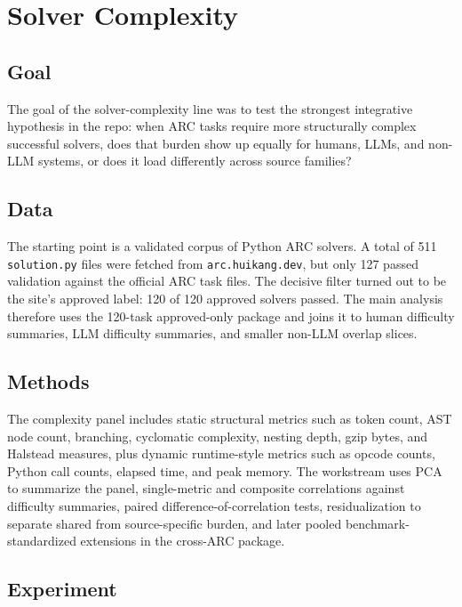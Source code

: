 \documentclass[11pt,letterpaper]{article}
\begin{document}
\section{Solver Complexity}

\subsection{Goal}

The goal of the solver-complexity line was to test the strongest integrative hypothesis in the repo: when ARC tasks require more structurally complex successful solvers, does that burden show up equally for humans, LLMs, and non-LLM systems, or does it load differently across source families?

\subsection{Data}

The starting point is a validated corpus of Python ARC solvers. A total of 511 \texttt{solution.py} files were fetched from \texttt{arc.huikang.dev}, but only 127 passed validation against the official ARC task files. The decisive filter turned out to be the site's approved label: 120 of 120 approved solvers passed. The main analysis therefore uses the 120-task approved-only package and joins it to human difficulty summaries, LLM difficulty summaries, and smaller non-LLM overlap slices.

\subsection{Methods}

The complexity panel includes static structural metrics such as token count, AST node count, branching, cyclomatic complexity, nesting depth, gzip bytes, and Halstead measures, plus dynamic runtime-style metrics such as opcode counts, Python call counts, elapsed time, and peak memory. The workstream uses PCA to summarize the panel, single-metric and composite correlations against difficulty summaries, paired difference-of-correlation tests, residualization to separate shared from source-specific burden, and later pooled benchmark-standardized extensions in the cross-ARC package.

\subsection{Experiment}
\end{document}
